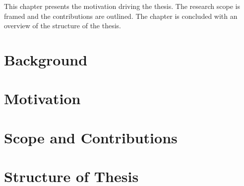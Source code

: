 This chapter presents the motivation driving the thesis. The research scope is framed and the contributions are outlined. The chapter is concluded with an overview of the structure of the thesis.

\section{Background}
\label{sec:Introduction:Background}


\section{Motivation}
\label{sec:Introduction:Motivation}


\section{Scope and Contributions}
\label{sec:Introduction:ScopeAndContributions}


%

\section{Structure of Thesis}
\label{sec:Introduction:StructureOfThesis}

